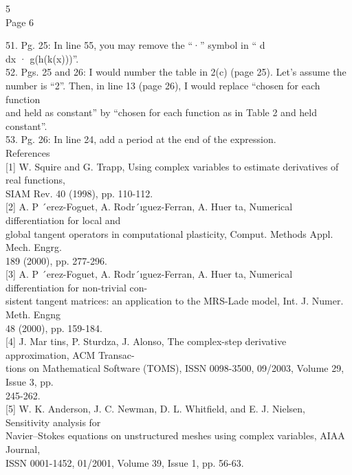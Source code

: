 5 \\

Page 6

51. Pg. 25: In line 55, you may remove the ``·'' symbol in `` d \\dx ·
g(h(k(x)))''. \\52. Pgs. 25 and 26: I would number the table in 2(c)
(page 25). Let's assume the \\number is ``2''. Then, in line 13 (page
26), I would replace ``chosen for each function \\and held as constant''
by ``chosen for each function as in Table 2 and held constant''. \\53.
Pg. 26: In line 24, add a period at the end of the expression. \\

References \\

{[}1{]} W. Squire and G. Trapp, Using complex variables to estimate
derivatives of real functions, \\SIAM Rev. 40 (1998), pp. 110-112. \\

{[}2{]} A. P ´erez-Foguet, A. Rodr´ıguez-Ferran, A. Huer ta, Numerical
differentiation for local and \\global tangent operators in
computational plasticity, Comput. Methods Appl. Mech. Engrg. \\189
(2000), pp. 277-296. \\

{[}3{]} A. P ´erez-Foguet, A. Rodr´ıguez-Ferran, A. Huer ta, Numerical
differentiation for non-trivial con- \\sistent tangent matrices: an
application to the MRS-Lade model, Int. J. Numer. Meth. Engng \\48
(2000), pp. 159-184. \\

{[}4{]} J. Mar tins, P. Sturdza, J. Alonso, The complex-step derivative
approximation, ACM Transac- \\tions on Mathematical Software (TOMS),
ISSN 0098-3500, 09/2003, Volume 29, Issue 3, pp. \\245-262. \\

{[}5{]} W. K. Anderson, J. C. Newman, D. L. Whitﬁeld, and E. J. Nielsen,
Sensitivity analysis for \\Navier--Stokes equations on unstructured
meshes using complex variables, AIAA Journal, \\ISSN 0001-1452, 01/2001,
Volume 39, Issue 1, pp. 56-63. \\

